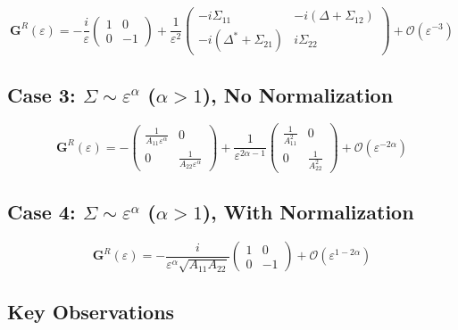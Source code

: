 \documentclass[12pt]{article}
\begin{document}
\begin{equation}
\mathbf{G}^R(\varepsilon) = -\frac{i}{\varepsilon}\begin{pmatrix}
1 & 0 \\
0 & -1
\end{pmatrix} + \frac{1}{\varepsilon^2}\begin{pmatrix}
-i\Sigma_{11} & -i(\Delta + \Sigma_{12}) \\
-i(\Delta^* + \Sigma_{21}) & i\Sigma_{22}
\end{pmatrix} + \mathcal{O}(\varepsilon^{-3})
\end{equation}

\subsection{Case 3: $\Sigma \sim \varepsilon^\alpha$ ($\alpha > 1$), No Normalization}

\begin{equation}
\mathbf{G}^R(\varepsilon) = -\begin{pmatrix}
\frac{1}{A_{11}\varepsilon^\alpha} & 0 \\
0 & \frac{1}{A_{22}\varepsilon^\alpha}
\end{pmatrix} + \frac{1}{\varepsilon^{2\alpha-1}}\begin{pmatrix}
\frac{1}{A_{11}^2} & 0 \\
0 & \frac{1}{A_{22}^2}
\end{pmatrix} + \mathcal{O}(\varepsilon^{-2\alpha})
\end{equation}

\subsection{Case 4: $\Sigma \sim \varepsilon^\alpha$ ($\alpha > 1$), With Normalization}

\begin{equation}
\mathbf{G}^R(\varepsilon) = -\frac{i}{\varepsilon^\alpha\sqrt{A_{11}A_{22}}}\begin{pmatrix}
1 & 0 \\
0 & -1
\end{pmatrix} + \mathcal{O}(\varepsilon^{1-2\alpha})
\end{equation}

\subsection{Key Observations}
\end{document}
